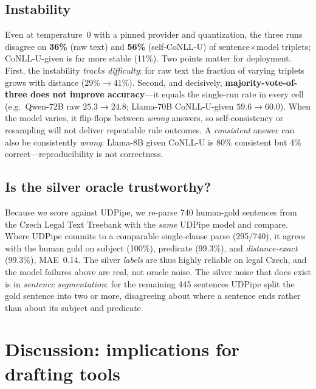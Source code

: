 \documentclass[11pt]{article}
\begin{document}
\subsection{Instability}
\label{sec:instab}

Even at temperature~0 with a pinned provider and quantization, the three runs disagree on
\textbf{36\%} (raw text) and \textbf{56\%} (self-CoNLL-U) of sentence$\times$model triplets;
CoNLL-U-given is far more stable (11\%). Two points matter for deployment. First, the instability
\emph{tracks difficulty}: for raw text the fraction of varying triplets grows with distance
($29\%\!\rightarrow\!41\%$). Second, and decisively, \textbf{majority-vote-of-three does not improve
accuracy}---it equals the single-run rate in every cell (e.g.\ Qwen-72B raw $25.3\!\rightarrow\!24.8$;
Llama-70B CoNLL-U-given $59.6\!\rightarrow\!60.0$). When the model varies, it flip-flops between
\emph{wrong} answers, so self-consistency or resampling will not deliver repeatable rule outcomes.
A \emph{consistent} answer can also be consistently \emph{wrong}: Llama-8B given CoNLL-U is 80\%
consistent but 4\% correct---reproducibility is not correctness.

\subsection{Is the silver oracle trustworthy?}
\label{sec:noisefloor}

Because we score against UDPipe, we re-parse 740 human-gold sentences from the Czech Legal Text
Treebank \citep{kriz2018cltt} with the \emph{same} UDPipe model and compare. Where UDPipe commits to
a comparable single-clause parse (295/740), it agrees with the human gold on subject (100\%),
predicate (99.3\%), and \emph{distance-exact} (99.3\%), MAE~0.14. The silver \emph{labels} are thus
highly reliable on legal Czech, and the model failures above are real, not oracle noise. The silver
noise that does exist is in \emph{sentence segmentation}: for the remaining 445 sentences UDPipe
split the gold sentence into two or more, disagreeing about where a sentence ends rather than about
its subject and predicate.

\section{Discussion: implications for drafting tools}
\end{document}
